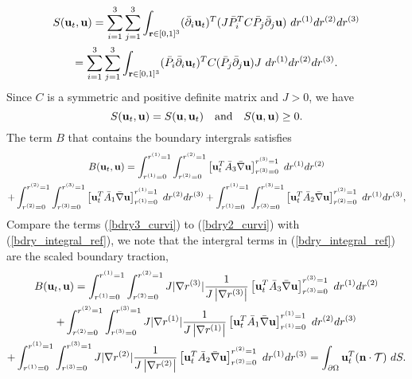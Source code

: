 \documentclass[a4paper]{article}
\begin{document}
\begin{multline*}
S({\bf u}_t,{\bf u}) = \sum_{i=1}^3\sum_{j=1}^3 \int_{{\bf r}\in[0,1]^3} (\bar{\partial}_i {\bf u}_t)^T(J\bar{P}_i^TC\bar{P}_j\bar{\partial}_j {\bf u})\ dr^{(1)}dr^{(2)}dr^{(3)} \\
= \sum_{i=1}^3\sum_{j=1}^3 \int_{{\bf r}\in[0,1]^3} (\bar{P}_i\bar{\partial}_i {\bf u}_t)^TC(\bar{P}_j\bar{\partial}_j {\bf u}) J\ dr^{(1)}dr^{(2)}dr^{(3)}.
\end{multline*}
Since $C$ is a symmetric and positive definite matrix and $J > 0$, we have 
\begin{equation*}
S({\bf u}_t,{\bf u}) = S({\bf u},{\bf u}_t) \ \ \  \text{and} \ \ \ S({\bf u},{\bf u}) \geq 0.
\end{equation*}
The term $B$ that contains the boundary intergrals satisfies
\begin{multline}\label{bdry_integral_ref}
B({\bf u}_t,{\bf u}) = \int_{r^{(1)} = 0}^{r^{(1)} = 1} \int_{r^{(2)} = 0}^{r^{(2)} = 1}  \left[{\bf u}_t^T\bar{A}_3\bar{\nabla} {\bf u}\right]_{r^{(3)}=0}^{r^{(3)}=1} \ dr^{(1)}dr^{(2)}\\
+ \int_{r^{(2)} = 0}^{r^{(2)} = 1} \int_{r^{(3)} = 0}^{r^{(3)} = 1}  \left[{\bf u}_t^T\bar{A}_1\bar{\nabla} {\bf u}\right]_{r^{(1)}=0}^{r^{(1)}=1}\ dr^{(2)}dr^{(3)} +\int_{r^{(1)} = 0}^{r^{(1)} = 1} \int_{r^{(3)} = 0}^{r^{(3)} = 1}  \left[{\bf u}_t^T\bar{A}_2\bar{\nabla} {\bf u}\right]_{r^{(2)}=0}^{r^{(2)}=1} \ dr^{(1)}dr^{(3)},
\end{multline}
Compare the terms (\ref{bdry3_curvi}) to (\ref{bdry2_curvi}) with (\ref{bdry_integral_ref}), we note that the intergral terms in (\ref{bdry_integral_ref}) are the scaled boundary traction,
\begin{multline}\label{bdry_integral_curvi}
B({\bf u}_t,{\bf u}) = \int_{r^{(1)} = 0}^{r^{(1)} = 1} \int_{r^{(2)} = 0}^{r^{(2)} = 1} J|\nabla r^{(3)}|\frac{1}{J\left|\nabla r^{(3)}\right|} \left[{\bf u}_t^T\bar{A}_3\bar{\nabla} {\bf u}\right]_{r^{(3)}=0}^{r^{(3)}=1} \ dr^{(1)}dr^{(2)}\\
+ \int_{r^{(2)} = 0}^{r^{(2)} = 1} \int_{r^{(3)} = 0}^{r^{(3)} = 1} J|\nabla r^{(1)}|\frac{1}{J\left|\nabla r^{(1)}\right|}  \left[{\bf u}_t^T\bar{A}_1\bar{\nabla} {\bf u}\right]_{r^{(1)}=0}^{r^{(1)}=1}\ dr^{(2)}dr^{(3)} \\
+\int_{r^{(1)} = 0}^{r^{(1)} = 1} \int_{r^{(3)} = 0}^{r^{(3)} = 1} J|\nabla r^{(2)}|\frac{1}{J\left|\nabla r^{(2)}\right|}  \left[{\bf u}_t^T\bar{A}_2\bar{\nabla} {\bf u}\right]_{r^{(2)}=0}^{r^{(2)}=1} \ dr^{(1)}dr^{(3)} = \int_{\partial \Omega} {\bf u}_t^T({\bf n}\cdot\mathcal{T})\ dS.
\end{multline}
\end{document}
